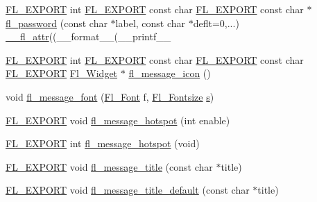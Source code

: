 \begin{DoxyCompactItemize}
\item 
\hyperlink{_fl___export_8_h_aa9ba29a18aee9d738370a06eeb4470fc}{F\+L\+\_\+\+E\+X\+P\+O\+RT} int \hyperlink{_fl___export_8_h_aa9ba29a18aee9d738370a06eeb4470fc}{F\+L\+\_\+\+E\+X\+P\+O\+RT} const char \hyperlink{_fl___export_8_h_aa9ba29a18aee9d738370a06eeb4470fc}{F\+L\+\_\+\+E\+X\+P\+O\+RT} const char $\ast$ \hyperlink{fl__ask_8_h_af4d1a40c51a11542958ccec0f6807a81}{fl\+\_\+password} (const char $\ast$label, const char $\ast$deflt=0,...) \hyperlink{fl__ask_8_h_abd901bc7c322836b976d5ea9efc23258}{\+\_\+\+\_\+fl\+\_\+attr}((\+\_\+\+\_\+format\+\_\+\+\_\+(\+\_\+\+\_\+printf\+\_\+\+\_\+
\item 
\hyperlink{_fl___export_8_h_aa9ba29a18aee9d738370a06eeb4470fc}{F\+L\+\_\+\+E\+X\+P\+O\+RT} int \hyperlink{_fl___export_8_h_aa9ba29a18aee9d738370a06eeb4470fc}{F\+L\+\_\+\+E\+X\+P\+O\+RT} const char \hyperlink{_fl___export_8_h_aa9ba29a18aee9d738370a06eeb4470fc}{F\+L\+\_\+\+E\+X\+P\+O\+RT} const char \hyperlink{_fl___export_8_h_aa9ba29a18aee9d738370a06eeb4470fc}{F\+L\+\_\+\+E\+X\+P\+O\+RT} \hyperlink{class_fl___widget}{Fl\+\_\+\+Widget} $\ast$ \hyperlink{fl__ask_8_h_a17d85f096a3f0239aec1c16e7778aac7}{fl\+\_\+message\+\_\+icon} ()
\item 
void \hyperlink{fl__ask_8_h_aafb997b8fea4974259984a410db161a2}{fl\+\_\+message\+\_\+font} (\hyperlink{_enumerations_8_h_a2ac46d9f082834b969fffe490a03a709}{Fl\+\_\+\+Font} f, \hyperlink{_enumerations_8_h_ad58927f5c691454480f7cd28362502f1}{Fl\+\_\+\+Fontsize} \hyperlink{forms_8_h_a672b4f0a8c8a6db61068c721f799d87f}{s})
\item 
\hyperlink{_fl___export_8_h_aa9ba29a18aee9d738370a06eeb4470fc}{F\+L\+\_\+\+E\+X\+P\+O\+RT} void \hyperlink{fl__ask_8_h_a8ddef2e74d830bec4b1192a0b157b9de}{fl\+\_\+message\+\_\+hotspot} (int enable)
\item 
\hyperlink{_fl___export_8_h_aa9ba29a18aee9d738370a06eeb4470fc}{F\+L\+\_\+\+E\+X\+P\+O\+RT} int \hyperlink{fl__ask_8_h_aeafed56c84b8f5c9bbc98104411a8aef}{fl\+\_\+message\+\_\+hotspot} (void)
\item 
\hyperlink{_fl___export_8_h_aa9ba29a18aee9d738370a06eeb4470fc}{F\+L\+\_\+\+E\+X\+P\+O\+RT} void \hyperlink{fl__ask_8_h_a0be75f2113fddabfb1da43959089f244}{fl\+\_\+message\+\_\+title} (const char $\ast$title)
\item 
\hyperlink{_fl___export_8_h_aa9ba29a18aee9d738370a06eeb4470fc}{F\+L\+\_\+\+E\+X\+P\+O\+RT} void \hyperlink{fl__ask_8_h_aa042d79d682f16a7bb82d8834ae2f363}{fl\+\_\+message\+\_\+title\+\_\+default} (const char $\ast$title)
\end{DoxyCompactItemize}
